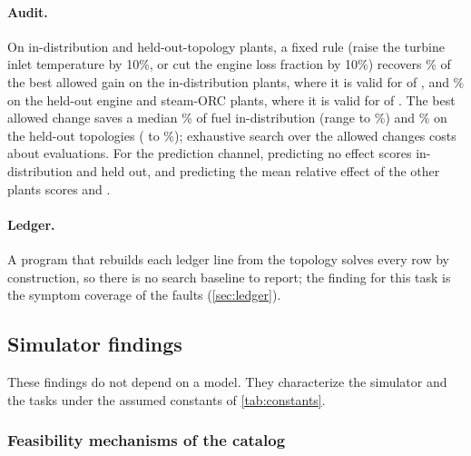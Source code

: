 \paragraph{Audit.}
On  in-distribution and  held-out-topology plants, a fixed rule (raise the turbine inlet temperature by 10\%, or cut the engine loss fraction by 10\%) recovers
\% of the best allowed gain on the in-distribution plants, where it is valid for  of , and \% on the held-out engine and steam-ORC plants, where it is
valid for  of . The best allowed change saves a median \% of fuel in-distribution (range  to \%) and
\% on the held-out topologies ( to \%); exhaustive search over the allowed changes costs about  evaluations. For the prediction channel,
predicting no effect scores  in-distribution and  held out, and predicting the mean relative effect of the other plants scores  and .

\paragraph{Ledger.}
A program that rebuilds each ledger line from the topology solves every row by construction, so there is no search baseline to report; the finding for this task is the symptom coverage of the faults (\cref{sec:ledger}).

\subsection{Simulator findings}\label{sec:findings}

These findings do not depend on a model. They characterize the simulator and the tasks under the assumed constants of \cref{tab:constants}.

\subsubsection{Feasibility mechanisms of the catalog}\label{sec:feasibility}

